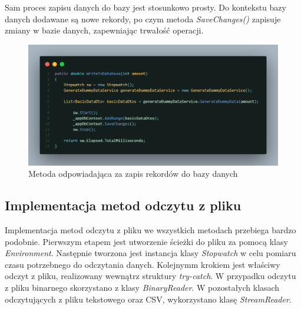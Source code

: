 \documentclass{report}
\begin{document}
Sam proces zapisu danych do bazy jest stosunkowo prosty. Do kontekstu bazy danych dodawane są nowe rekordy, po czym metoda \textit{SaveChanges()} zapisuje zmiany w bazie danych, zapewniając trwałość operacji.

\begin{figure}[H]
    \centering
    \includegraphics[width=1.0\textwidth]{src/db_write.png}
    \caption{Metoda odpowiadająca za zapis rekordów do bazy danych}
\end{figure}

\subsection{\Large Implementacja metod odczytu z pliku}

Implementacja metod odczytu z pliku we wszystkich metodach przebiega bardzo podobnie. Pierwszym etapem jest utworzenie ścieżki do pliku za pomocą klasy \textit{Environment}. Następnie tworzona jest instancja klasy \textit{Stopwatch} w celu pomiaru czasu potrzebnego do odczytania danych. Kolejnymm krokiem jest właściwy odczyt z pliku, realizowany wewnątrz struktury \textit{try-catch}. W przypadku odczytu z pliku binarnego skorzystano z klasy \textit{BinaryReader}. W pozostałych klasach odczytujących z pliku tekstowego oraz CSV, wykorzystano klasę \textit{StreamReader}. 
\end{document}
